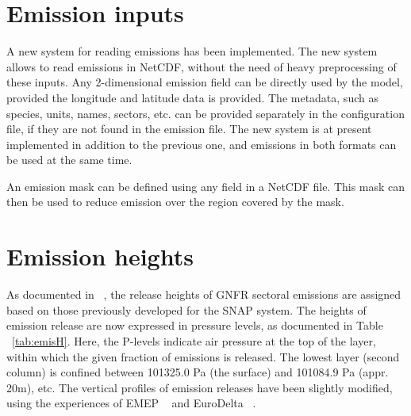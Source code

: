 \section{Emission inputs}
\label{sec:EmisInp}

A new system for reading emissions has been implemented. The new system allows
to read emissions in NetCDF, without the need of heavy preprocessing of these inputs.
Any 2-dimensional emission field can be directly used by the model, provided
the longitude and latitude data is provided. The metadata, such as species, units,
names, sectors, etc. can be provided separately in the configuration file,
if they are not found in the emission file.
The new system is at present implemented in addition to the previous one, and
emissions in both formats can be used at the same time.

An emission mask can be defined using any field in a NetCDF file. This mask can then
be used to reduce emission over the region covered by the mask.

\section{Emission heights}
\label{sec:EmisHeight}

As documented in ~\citet{R2016}, the release heights of GNFR sectoral
emissions are assigned based on those previously developed for the SNAP
system. The heights of emission release are now expressed in
pressure levels, as documented in Table ~\ref{tab:emisH}. Here, the
P-levels indicate air pressure at the top of the layer, within which
the given fraction of emissions is released. The lowest layer (second
column) is confined between 101325.0 Pa (the surface) and 101084.9 Pa
(appr. 20m), etc. The vertical profiles of emission releases have been
slightly modified, using the experiences of EMEP
~\citep{Simpson_et_al:EMEP} and EuroDelta ~\citep{ED3:2014}.



